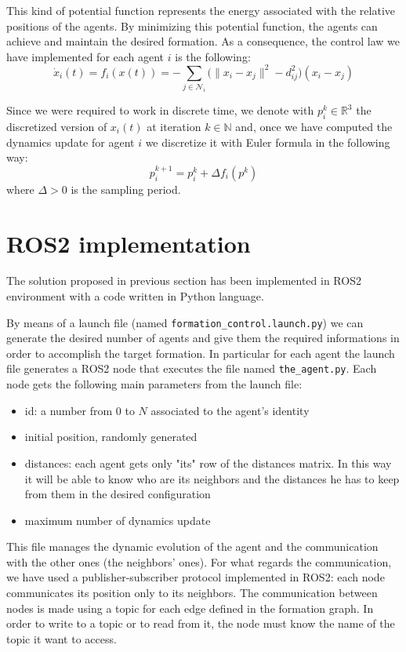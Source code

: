 \documentclass[a4paper,11pt,oneside]{book}
\begin{document}
This kind of potential function represents the energy associated with the relative positions of the agents. By minimizing this potential function, the agents can achieve and maintain the desired formation.
As a consequence, the control law we have implemented for each agent $i$ is the following:
\begin{equation}
\dot{x}_i(t) = f_i(x(t)) = - \sum_{j \in \mathcal{N}_i} \bigg( \lVert x_i - x_j \rVert^2 - d_{ij}^2 \bigg) (x_i - x_j )
\label{Dynamics_no_collision_avoidance}
\end{equation}

Since we were required to work in discrete time, we denote with $p_i^k \in \mathbb{R}^3$ the discretized version of $x_i(t)$ at iteration $k \in \mathbb{N}$ and, once we have computed the dynamics update for agent $i$ we discretize it with Euler formula in the following way:
\begin{equation}
p_i^{k+1} = p_i^{k} + \Delta f_i(p^k)
\end{equation}
where $\Delta > 0$ is the sampling period.

\section{ROS2 implementation}
The solution proposed in previous section has been implemented in ROS2 environment with a code written in Python language.

\bigskip
By means of a launch file (named \texttt{formation\_control.launch.py}) we can generate the desired number of agents and give them the required informations in order to accomplish the target formation. In particular for each agent the launch file generates a ROS2 node that executes the file named \texttt{the\_agent.py}. Each node gets the following main parameters from the launch file:
\begin{itemize}
\item id: a number from $0$ to $N$ associated to the agent's identity
\item initial position, randomly generated
\item distances: each agent gets only "its" row of the distances matrix. In this way it will be able to know who are its neighbors and the distances he has to keep from them in the desired configuration
\item maximum number of dynamics update
\end{itemize}
This file manages the dynamic evolution of the agent and the communication with the other ones (the neighbors' ones). For what regards the communication, we have used a publisher-subscriber protocol implemented in ROS2: each node communicates its position only to its neighbors. The communication between nodes is made using a topic for each edge defined in the formation graph. In order to write to a topic or to read from it, the node must know the name of the topic it want to access.
\end{document}
